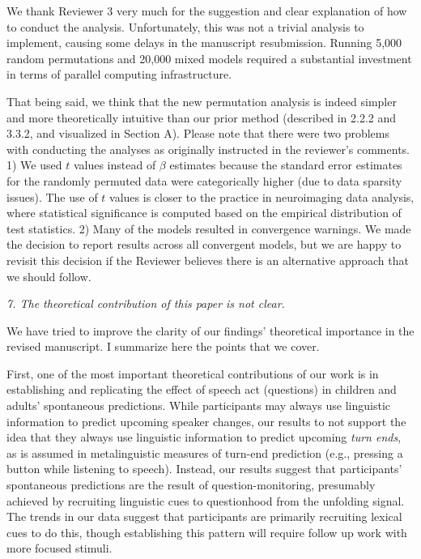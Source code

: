 \documentclass[11pt,a4paper]{letter} %
\begin{document}
\begin{letter}{}
\noindent We thank Reviewer 3 very much for the suggestion and clear explanation of how to conduct the analysis. Unfortunately, this was not a trivial analysis to implement, causing some delays in the manuscript resubmission. Running 5,000 random permutations and 20,000 mixed models required a substantial investment in terms of parallel computing infrastructure. 

That being said, we think that the new permutation analysis is indeed simpler and more theoretically intuitive than our prior method (described in 2.2.2 and 3.3.2, and visualized in Section A). Please note that there were two problems with conducting the analyses as originally instructed in the reviewer's comments. 1) We used $t$ values instead of $\beta$ estimates because the standard error estimates for the randomly permuted data were categorically higher (due to data sparsity issues). The use of $t$ values is closer to the practice in neuroimaging data analysis, where statistical significance is computed based on the empirical distribution of test statistics. 2) Many of the models resulted in convergence warnings. We made the decision to report results across all convergent models, but we are happy to revisit this decision if the Reviewer believes there is an alternative approach that we should follow. 

\smallskip

\noindent \textit{7. The theoretical contribution of this paper is not clear.}

\noindent We have tried to improve the clarity of our findings' theoretical importance in the revised manuscript. I summarize here the points that we cover. 

First, one of the most important theoretical contributions of our work is in establishing and replicating the effect of speech act (questions) in children and adults' spontaneous predictions. While participants may always use linguistic information to predict upcoming speaker changes, our results to not support the idea that they always use linguistic information to predict upcoming \emph{turn ends}, as is assumed in metalinguistic measures of turn-end prediction (e.g., pressing a button while listening to speech). Instead, our results suggest that participants' spontaneous predictions are the result of question-monitoring, presumably achieved by recruiting linguistic cues to questionhood from the unfolding signal. The trends in our data suggest that participants are primarily recruiting lexical cues to do this, though establishing this pattern will require follow up work with more focused stimuli.


\end{letter}
\end{document}
